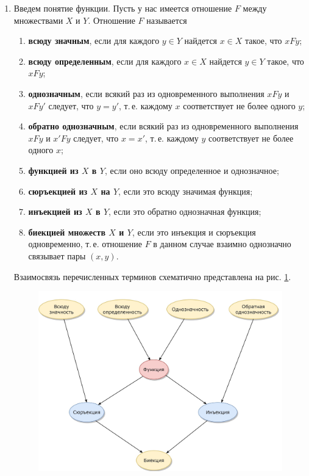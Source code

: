 \begin{enumerate}
\item Введем понятие функции. Пусть у нас имеется отношение $F$ между множествами $X$ и $Y$. Отношение $F$ называется
\begin{enumerate}[{\bf Func1}]
\item \textbf{всюду значным}, если для каждого $y\in Y$ найдется $x\in X$ такое, что $xFy$;
\item \textbf{всюду определенным}, если для каждого $x\in X$ найдется $y\in Y$ такое, что $xFy$;
\item \textbf{однозначным}, если всякий раз из одновременного выполнения $xFy$ и $xFy'$ следует, что $y=y'$, т.\,е. каждому $x$ соответствует не более одного $y$;
\item \textbf{обратно однозначным}, если всякий раз из одновременного выполнения $xFy$ и $x'Fy$ следует, что $x=x'$, т.\,е. каждому $y$ соответствует не более одного $x$;
\item \textbf{функцией из $X$ в $Y$}, если оно всюду определенное и однозначное;

\item \textbf{сюръекцией из $X$ на $Y$}, если это всюду значимая функция;
\item \textbf{инъекцией из $X$ в $Y$}, если это обратно однозначная функция;
\item \textbf{биекцией множеств $X$ и $Y$}, если это инъекция и сюръекция одновременно, т.\,е. отношение $F$ в данном случае взаимно однозначно связывает пары $(x,y)$.
\end{enumerate}
Взаимосвязь перечисленных терминов схематично представлена на рис. \ref{function}.

\begin{figure}[hbt!]
\begin{center}
\includegraphics[scale=0.3]{function.png}
\end{center}
\caption{}\label{function}
\end{figure}


\end{enumerate}
